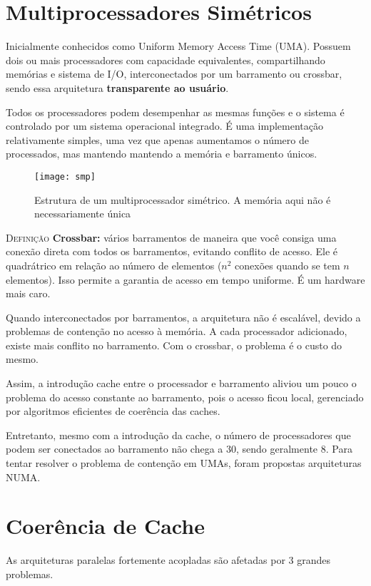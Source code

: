 \section{Multiprocessadores Simétricos}

Inicialmente conhecidos como Uniform Memory Access Time (UMA). Possuem dois ou mais processadores com capacidade equivalentes, compartilhando memórias e sistema de I/O, interconectados por um barramento ou crossbar, sendo essa arquitetura \textbf{transparente ao usuário}.

Todos os processadores podem desempenhar as mesmas funções e o sistema é controlado por um sistema operacional integrado. É uma implementação relativamente simples, uma vez que apenas aumentamos o número de processados, mas mantendo mantendo a memória e barramento únicos.

\begin{figure}[ht]
  \centering
  \texttt{[image: smp]}
  \label{fig:smp}
  \caption{Estrutura de um multiprocessador simétrico. A memória aqui não é necessariamente única}
\end{figure}

\textsc{Definição} \textbf{Crossbar:} vários barramentos de maneira que você consiga uma conexão direta com todos os barramentos, evitando conflito de acesso. Ele é quadrátrico em relação ao número de elementos ($n^2$ conexões quando se tem $n$ elementos). Isso permite a garantia de acesso em tempo uniforme. É um hardware mais caro.

Quando interconectados por barramentos, a arquitetura não é escalável, devido a problemas de contenção no acesso à memória. A cada processador adicionado, existe mais conflito no barramento. Com o crossbar, o problema é o custo do mesmo.

Assim, a introdução cache entre o processador e barramento aliviou um pouco o problema do acesso constante ao barramento, pois o acesso ficou local, gerenciado por algoritmos eficientes de coerência das caches.

Entretanto, mesmo com a introdução da cache, o número de processadores que podem ser conectados ao barramento não chega a 30, sendo geralmente 8. Para tentar resolver o problema de contenção em UMAs, foram propostas arquiteturas NUMA.




\section{Coerência de Cache}
As arquiteturas paralelas fortemente acopladas são afetadas por 3 grandes problemas.

